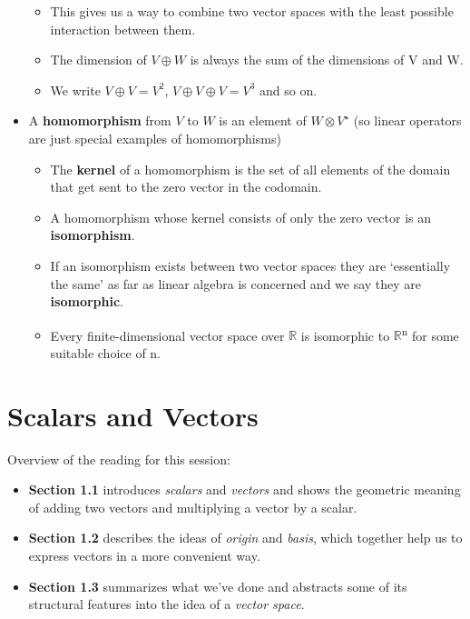 \documentclass[oneside,english]{amsbook}
\numberwithin{section}{chapter}
\theoremstyle{plain}
\theoremstyle{definition}
\begin{document}
\begin{itemize}
	\begin{itemize}
		\item
		This gives us a way to combine two vector spaces with the least
		possible interaction between them.
		\item
		The dimension of $V\oplus W$ is always the sum of the dimensions of V and W.
		\item
		We write $V\oplus V = V^2$, $V\oplus V\oplus V = V^3$
		and so on.
	\end{itemize}
	\item
	A \textbf{homomorphism} from $V$ to $W$ is an element of $W\otimes V^\star$ (so linear
	operators are just special examples of homomorphisms)
	
	\begin{itemize}
		\item
		The \textbf{kernel} of a homomorphism is the set of all elements of
		the domain that get sent to the zero vector in the codomain.
		\item
		A homomorphism whose kernel consists of only the zero vector is an
		\textbf{isomorphism}.
		\item
		If an isomorphism exists between two vector spaces they are
		`essentially the same' as far as linear algebra is concerned and
		we say they are \textbf{isomorphic}.
		\item
		Every finite-dimensional vector space over $\mathbb{R}$ is isomorphic
		to $\mathbb{R}$\textsuperscript{n} for some suitable choice of n.
	\end{itemize}
\end{itemize}

\chapter{Scalars and Vectors}

Overview of the reading for this session:

\begin{itemize}
	\item
	\textbf{Section 1.1} introduces \emph{scalars} and \emph{vectors} and
	shows the geometric meaning of adding two vectors and multiplying a
	vector by a scalar.
	\item
	\textbf{Section 1.2} describes the ideas of \emph{origin} and
	\emph{basis}, which together help us to express vectors in a more
	convenient way.
	\item
	\textbf{Section 1.3} summarizes what we've done and abstracts some of
	its structural features into the idea of a \emph{vector space}.
\end{itemize}
\end{document}
